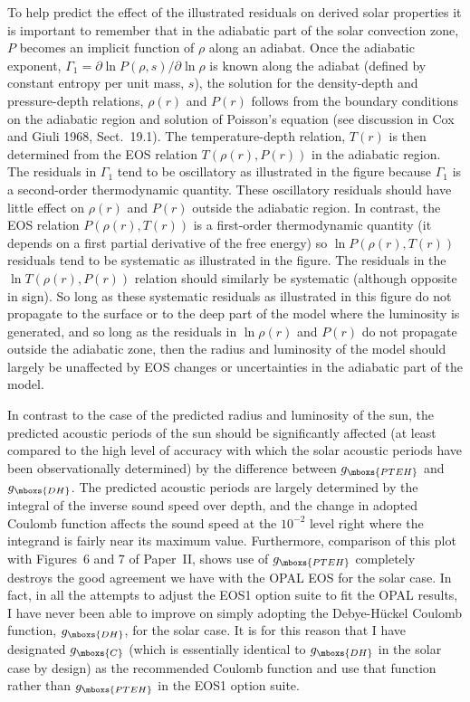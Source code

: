 To help predict the effect of the illustrated residuals on derived solar
properties it is important to remember that in the adiabatic part of the
solar convection zone, $P$ becomes an implicit function of $\rho$ along an
adiabat.  Once the adiabatic exponent, $\Gamma_1 = \partial \ln P(\rho,
s)/\partial \ln \rho$ is known along the adiabat (defined by constant
entropy per unit mass, $s$), the solution for the density-depth and
pressure-depth relations, $\rho(r)$ and $P(r)$ follows from the boundary
conditions on the adiabatic region and solution of Poisson's equation (see
discussion in Cox and Giuli 1968, Sect.~19.1).  The temperature-depth
relation, $T(r)$ is then determined from the EOS relation $T(\rho(r), P(r))$
in the adiabatic region. The residuals in $\Gamma_1$ tend to be oscillatory
as illustrated in the figure because $\Gamma_1$ is a second-order
thermodynamic quantity.  These oscillatory residuals should have little
effect on $\rho(r)$ and $P(r)$ outside the adiabatic region. In contrast,
the EOS relation $P(\rho(r),T(r))$ is a first-order thermodynamic quantity
(it depends on a first partial derivative of the free energy) so $\ln
P(\rho(r),T(r))$ residuals tend to be systematic as illustrated in the
figure.  The residuals in the $\ln T(\rho(r), P(r))$ relation should
similarly be systematic (although opposite in sign). So long as these
systematic residuals as illustrated in this figure do not propagate to the
surface or to the deep part of the model where the luminosity is generated,
and so long as the residuals in $\ln \rho(r)$ and $P(r)$ do not propagate
outside the adiabatic zone, then the radius and luminosity of the model
should largely be unaffected by EOS changes or uncertainties in the
adiabatic part of the model.

In contrast to the case of the predicted radius and luminosity of the sun,
the predicted acoustic periods of the sun should be significantly affected
(at least compared to the high level of accuracy with which the solar
acoustic periods have been observationally determined) by the difference
between $g_{\mboxs{PTEH}}$ and $g_{\mboxs{DH}}$.  The predicted acoustic
periods are largely determined by the integral of the inverse sound speed
over depth, and the change in adopted Coulomb function affects the sound
speed at the $10^{-2}$ level right where the integrand is fairly near its
maximum value. Furthermore, comparison of this plot with Figures~6 and 7 of
Paper~II, shows use of $g_{\mboxs{PTEH}}$ completely destroys the good
agreement we have with the OPAL EOS for the solar case. In fact, in all the
attempts to adjust the EOS1 option suite to fit the OPAL results, I have
never been able to improve on simply adopting the Debye-H\"uckel Coulomb
function, $g_{\mboxs{DH}}$, for the solar case.  It is for this reason that
I have designated $g_{\mboxs{C}}$ (which is essentially identical to
$g_{\mboxs{DH}}$ in the solar case by design) as the recommended Coulomb
function and use that function rather than $g_{\mboxs{PTEH}}$ in the EOS1
option suite.

